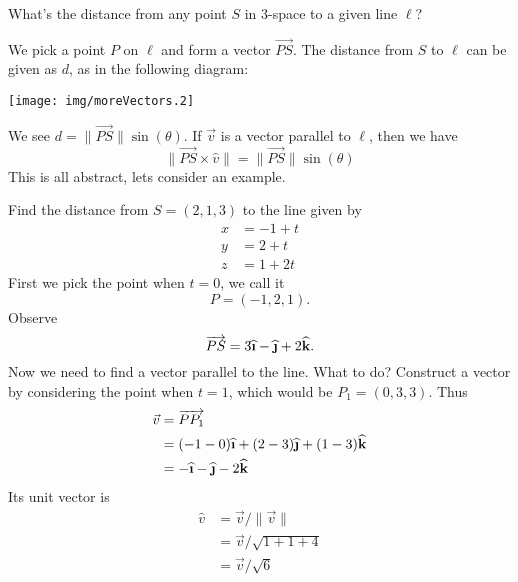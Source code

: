 What's the distance from any point $S$ in 3-space to a given line
$\ell$? 

We pick a point $P$ on $\ell$ and form a vector
$\overrightarrow{PS}$. The distance from $S$ to $\ell$ can be
given as $d$, as in the following diagram:
\begin{center}
\texttt{[image: img/moreVectors.2]}
\end{center}
We see $d=\|\overrightarrow{PS}\|\sin(\theta)$. If $\vec{v}$ is a
vector parallel to $\ell$, then we have
\begin{equation}
\|\overrightarrow{PS}\times\widehat{v}\|=\|\overrightarrow{PS}\|\sin(\theta)
\end{equation}
This is all abstract, lets consider an example.

\begin{example}
Find the distance from $S=(2,1,3)$ to the line given by
\begin{equation}
\begin{aligned}
x &= -1+t\\
y &= 2+t\\
z &= 1+2t
\end{aligned}
\end{equation}
First we pick the point when $t=0$, we call it
\begin{equation}
P = (-1,2,1).
\end{equation}
Observe
\begin{equation}
\overrightarrow{PS} =
3\widehat{\textbf{\i}}-\widehat{\textbf{\j}}+2\widehat{\textbf{k}}. 
\end{equation}
Now we need to find a vector parallel to the line. What to do?
Construct a vector by considering the point when $t=1$, which
would be $P_{1}=(0,3,3)$. Thus
\begin{equation}
\begin{aligned}
\vec{v}
&=\overrightarrow{PP_{1}}\\
&=(-1-0)\widehat{\textbf{\i}}+(2-3)\widehat{\textbf{\j}}+(1-3)\widehat{\textbf{k}}\\
&=-\widehat{\textbf{\i}}-\widehat{\textbf{\j}}-2\widehat{\textbf{k}}
\end{aligned}
\end{equation}
Its unit vector is
\begin{equation}
\begin{aligned}
\widehat{v} &= \vec{v}/\|\vec{v}\|\\
&= \vec{v}/\sqrt{1+1+4}\\ 
&= \vec{v}/\sqrt{6}

\end{aligned}
\end{equation}
\end{example}
